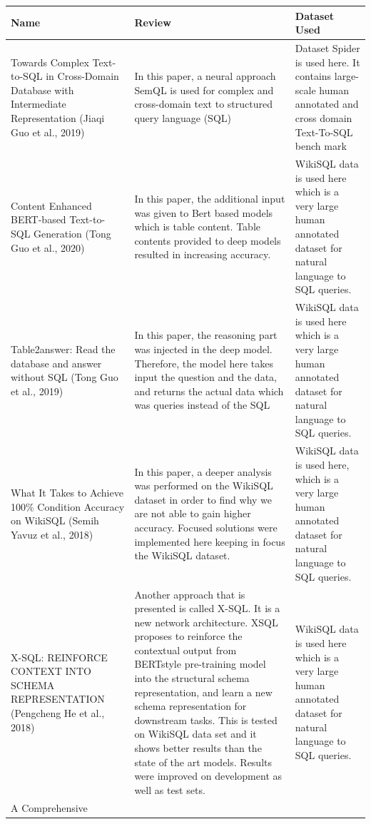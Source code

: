 \documentclass[12pt]{article}
\begin{document}
 

 \begin{longtable}{ | m{4.5cm}| m{6cm} |m{5cm}|} 
 \hline
  Name & Review & Dataset Used \\ 
 \hline\hline
\endhead
 Towards Complex
Text-to-SQL in
Cross-Domain
Database with
Intermediate
Representation  (Jiaqi Guo et al., 2019) & In this paper, a neural
approach SemQL is used for
complex and cross-domain
text to structured query
language (SQL) &Dataset Spider is used here. It
contains large-scale human
annotated and cross domain
Text-To-SQL bench mark  \\ 
  Content Enhanced
BERT-based
Text-to-SQL
Generation (Tong Guo et al., 2020) & In this paper, the additional
input was given to Bert based
models which is table content.
Table contents provided to
deep models resulted in
increasing accuracy. & WikiSQL data is used here which
is a very large human annotated
dataset for natural language to
SQL queries.  \\ 
  Table2answer: Read
the database
and answer without
SQL (Tong Guo et al., 2019) &In this paper, the reasoning
part was injected in the deep
model. Therefore, the model
here takes input the question
and the data, and returns the
actual data which was queries
instead of the SQL &WikiSQL data is used here which
is a very large human annotated
dataset for natural language to
SQL queries.  \\ 
  What It Takes to
Achieve 100\%
Condition Accuracy
on WikiSQL (Semih Yavuz et al., 2018)  & In this paper, a deeper analysis
was performed on the
WikiSQL dataset in order to
find why we are not able to
gain higher accuracy. Focused
solutions were implemented
here keeping in focus the
WikiSQL dataset. &WikiSQL data is used here, which
is a very large human annotated
dataset for natural language to
SQL queries.  \\ 
  X-SQL: REINFORCE
CONTEXT INTO
SCHEMA
REPRESENTATION  (Pengcheng He et al., 2018)  & Another approach that is
presented is called X-SQL. It is
a new network architecture. XSQL proposes to reinforce the contextual output from BERTstyle pre-training model into
the structural schema
representation, and learn a
new schema representation
for downstream tasks. This is
tested on WikiSQL data set
and it shows better results
than the state of the art
models. Results were
improved on development as
well as test sets. & WikiSQL data is used here which
is a very large human annotated
dataset for natural language to
SQL queries.  \\ 
   A Comprehensive

\end{longtable}
\end{document}
